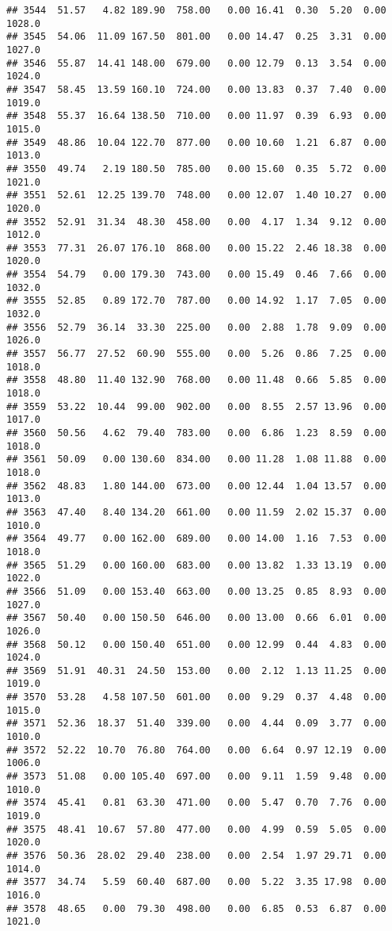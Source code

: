 \documentclass{article}\usepackage{graphicx, color}
\makeatletter
\newenvironment{kframe}{%
 \def\at@end@of@kframe{}%
 \ifinner\ifhmode%
  \def\at@end@of@kframe{\end{minipage}}%
  \begin{minipage}{\columnwidth}%
 \fi\fi%
 \def\FrameCommand##1{\hskip\@totalleftmargin \hskip-\fboxsep
 \colorbox{shadecolor}{##1}\hskip-\fboxsep
     \hskip-\linewidth \hskip-\@totalleftmargin \hskip\columnwidth}%
 \MakeFramed {\advance\hsize-\width
   \@totalleftmargin\z@ \linewidth\hsize
   \@setminipage}}%
 {\par\unskip\endMakeFramed%
 \at@end@of@kframe}
\newenvironment{knitrout}{}{} %
\makeatother
\begin{document}
\begin{knitrout}
\begin{kframe}
\begin{verbatim}
## 3544  51.57   4.82 189.90  758.00   0.00 16.41  0.30  5.20  0.00 1028.0
## 3545  54.06  11.09 167.50  801.00   0.00 14.47  0.25  3.31  0.00 1027.0
## 3546  55.87  14.41 148.00  679.00   0.00 12.79  0.13  3.54  0.00 1024.0
## 3547  58.45  13.59 160.10  724.00   0.00 13.83  0.37  7.40  0.00 1019.0
## 3548  55.37  16.64 138.50  710.00   0.00 11.97  0.39  6.93  0.00 1015.0
## 3549  48.86  10.04 122.70  877.00   0.00 10.60  1.21  6.87  0.00 1013.0
## 3550  49.74   2.19 180.50  785.00   0.00 15.60  0.35  5.72  0.00 1021.0
## 3551  52.61  12.25 139.70  748.00   0.00 12.07  1.40 10.27  0.00 1020.0
## 3552  52.91  31.34  48.30  458.00   0.00  4.17  1.34  9.12  0.00 1012.0
## 3553  77.31  26.07 176.10  868.00   0.00 15.22  2.46 18.38  0.00 1020.0
## 3554  54.79   0.00 179.30  743.00   0.00 15.49  0.46  7.66  0.00 1032.0
## 3555  52.85   0.89 172.70  787.00   0.00 14.92  1.17  7.05  0.00 1032.0
## 3556  52.79  36.14  33.30  225.00   0.00  2.88  1.78  9.09  0.00 1026.0
## 3557  56.77  27.52  60.90  555.00   0.00  5.26  0.86  7.25  0.00 1018.0
## 3558  48.80  11.40 132.90  768.00   0.00 11.48  0.66  5.85  0.00 1018.0
## 3559  53.22  10.44  99.00  902.00   0.00  8.55  2.57 13.96  0.00 1017.0
## 3560  50.56   4.62  79.40  783.00   0.00  6.86  1.23  8.59  0.00 1018.0
## 3561  50.09   0.00 130.60  834.00   0.00 11.28  1.08 11.88  0.00 1018.0
## 3562  48.83   1.80 144.00  673.00   0.00 12.44  1.04 13.57  0.00 1013.0
## 3563  47.40   8.40 134.20  661.00   0.00 11.59  2.02 15.37  0.00 1010.0
## 3564  49.77   0.00 162.00  689.00   0.00 14.00  1.16  7.53  0.00 1018.0
## 3565  51.29   0.00 160.00  683.00   0.00 13.82  1.33 13.19  0.00 1022.0
## 3566  51.09   0.00 153.40  663.00   0.00 13.25  0.85  8.93  0.00 1027.0
## 3567  50.40   0.00 150.50  646.00   0.00 13.00  0.66  6.01  0.00 1026.0
## 3568  50.12   0.00 150.40  651.00   0.00 12.99  0.44  4.83  0.00 1024.0
## 3569  51.91  40.31  24.50  153.00   0.00  2.12  1.13 11.25  0.00 1019.0
## 3570  53.28   4.58 107.50  601.00   0.00  9.29  0.37  4.48  0.00 1015.0
## 3571  52.36  18.37  51.40  339.00   0.00  4.44  0.09  3.77  0.00 1010.0
## 3572  52.22  10.70  76.80  764.00   0.00  6.64  0.97 12.19  0.00 1006.0
## 3573  51.08   0.00 105.40  697.00   0.00  9.11  1.59  9.48  0.00 1010.0
## 3574  45.41   0.81  63.30  471.00   0.00  5.47  0.70  7.76  0.00 1019.0
## 3575  48.41  10.67  57.80  477.00   0.00  4.99  0.59  5.05  0.00 1020.0
## 3576  50.36  28.02  29.40  238.00   0.00  2.54  1.97 29.71  0.00 1014.0
## 3577  34.74   5.59  60.40  687.00   0.00  5.22  3.35 17.98  0.00 1016.0
## 3578  48.65   0.00  79.30  498.00   0.00  6.85  0.53  6.87  0.00 1021.0

\end{verbatim}
\end{kframe}
\end{knitrout}
\end{document}
